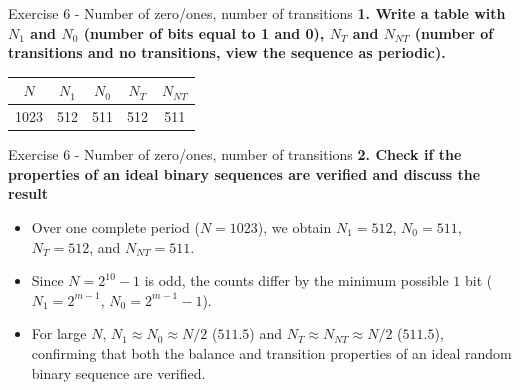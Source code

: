 \documentclass[10pt, aspectratio=169]{beamer}
\newcommand{\question}[1]{{\color{QuestionRed}\textbf{#1}}}
\begin{document}
\begin{frame}{Exercise 6 - Number of zero/ones, number of transitions}
	\question{1. Write a table with $N_1$ and $N_0$ (number of bits equal to 1 and 0), $N_T$ and $N_{NT}$ (number of transitions and no transitions, view the sequence as periodic).}
	
	\vspace{0.3cm}
	\begin{center}
		\begin{tabular}{ccccc}
			\toprule
			$N$ & $N_1$ & $N_0$ & $N_T$ & $N_{NT}$ \\
			\midrule
			1023 & 512 & 511 & 512 & 511 \\
			\bottomrule
		\end{tabular}
	\end{center}
\end{frame}

\begin{frame}{Exercise 6 - Number of zero/ones, number of transitions}
	\question{2. Check if the properties of an ideal binary sequences are verified and discuss the result}
	
	\vspace{0.25cm}
	\begin{itemize}
		\item Over one complete period ($N = 1023$), we obtain $N_1 = 512$, $N_0 = 511$, $N_T = 512$, and $N_{NT} = 511$.
		\item Since $N = 2^{10} - 1$ is odd, the counts differ by the minimum possible $1$ bit ($N_1 = 2^{m-1}$, $N_0 = 2^{m-1} - 1$).
		\item For large $N$, $N_1 \approx N_0 \approx N/2$ ($511.5$) and $N_T \approx N_{NT} \approx N/2$ ($511.5$), confirming that both the balance and transition properties of an ideal random binary sequence are verified.
	\end{itemize}
\end{frame}
\end{document}
